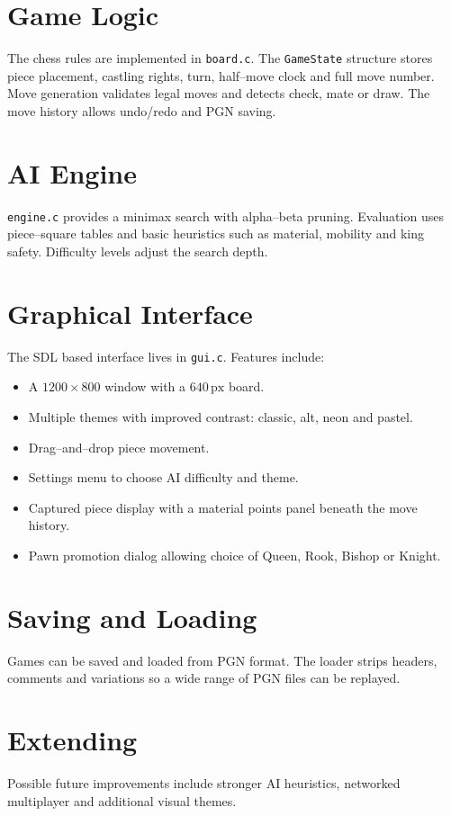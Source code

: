 \documentclass{article}
\begin{document}
\section{Game Logic}
The chess rules are implemented in \texttt{board.c}. The\newline
\texttt{GameState} structure stores piece placement, castling rights,
turn, half--move clock and full move number. Move generation validates
legal moves and detects check, mate or draw. The move history allows
undo/redo and PGN saving.

\section{AI Engine}
\texttt{engine.c} provides a minimax search with alpha--beta pruning.
Evaluation uses piece--square tables and basic heuristics such as
material, mobility and king safety. Difficulty levels adjust the search
depth.

\section{Graphical Interface}
The SDL based interface lives in \texttt{gui.c}. Features include:
\begin{itemize}
  \item A \(1200\times800\) window with a \(640\,\mathrm{px}\) board.
  \item Multiple themes with improved contrast: classic, alt, neon and pastel.
  \item Drag--and--drop piece movement.
  \item Settings menu to choose AI difficulty and theme.
  \item Captured piece display with a material points panel beneath the move history.
  \item Pawn promotion dialog allowing choice of Queen, Rook, Bishop or Knight.
\end{itemize}

\section{Saving and Loading}
Games can be saved and loaded from PGN format. The loader strips headers,
comments and variations so a wide range of PGN files can be replayed.

\section{Extending}
Possible future improvements include stronger AI heuristics, networked
multiplayer and additional visual themes.
\end{document}
